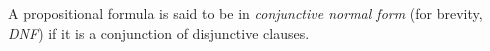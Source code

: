 

\setcounter{section}{1}
\setcounter{subsection}{5}
\setcounter{dfn}{18}

\begin{dfn}
A propositional formula is said to be in \emph{conjunctive normal form} (for brevity, \emph{DNF})
if it is a conjunction of disjunctive clauses.
\end{dfn}

